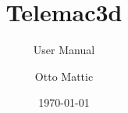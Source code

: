 \documentclass[Telemac3D]{../../data/TelemacDoc} %
\begin{document}
\let\cleardoublepage\clearpage

\title{Telemac3d}
\subtitle{User Manual}
\version{\telmaversion}
\author{Otto Mattic}
\date{\today}
\maketitle
\clearpage



\newpage

\thispagestyle{empty}

\TelemacCopyright{}




\pagestyle{empty} %

\tableofcontents%


\pagestyle{fancy} %












\end{document}
